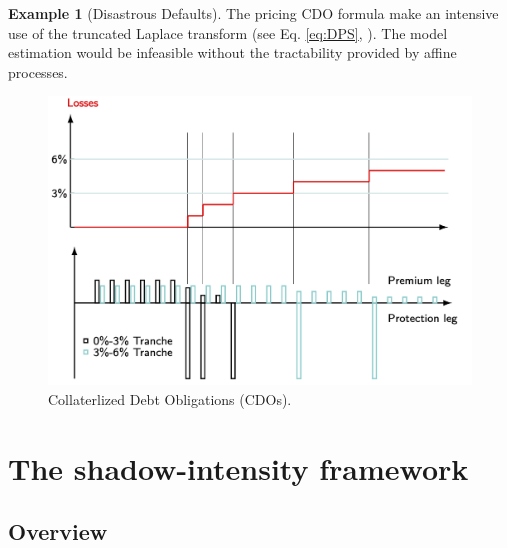 \documentclass[
  12pt,
]{book}
\theoremstyle{definition}
\theoremstyle{definition}
\newtheorem{example}{Example}[chapter]
\theoremstyle{definition}
\theoremstyle{definition}
\theoremstyle{remark}
\begin{document}
\begin{example}[Disastrous Defaults]
The pricing CDO formula make an intensive use of the truncated Laplace transform (see Eq. \eqref{eq:DPS}, \citet{Duffie_Pan_Singleton_2000}). The model estimation would be infeasible without the tractability provided by affine processes.

\begin{figure}

{\centering \includegraphics[width=0.9\linewidth]{figures/CDOs} 

}

\caption{Collaterlized Debt Obligations (CDOs).}\label{fig:CDOs}
\end{figure}

\end{example}

\hypertarget{the-shadow-intensity-framework}{%
\section{The shadow-intensity framework}\label{the-shadow-intensity-framework}}

\hypertarget{overview}{%
\subsection{Overview}\label{overview}}
\end{document}
